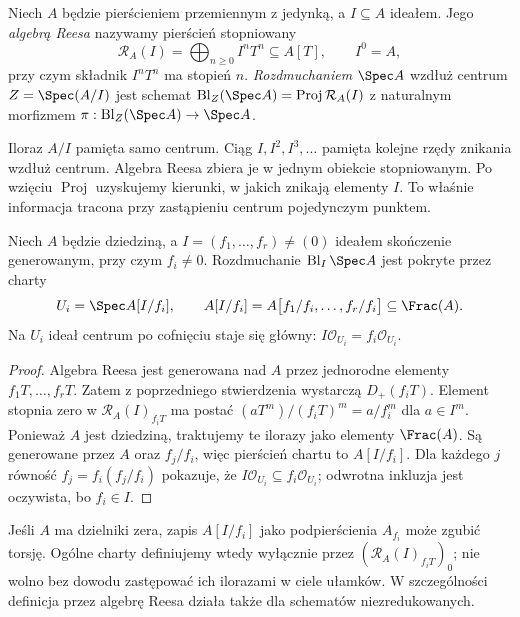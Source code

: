 \begin{definicja}
\label{def:ga5-rees}
Niech $A$ będzie pierścieniem przemiennym z jedynką,
a $I\subseteq A$ ideałem. Jego \emph{algebrą Reesa}
nazywamy pierścień stopniowany
\[
 \mathcal R_A(I)=\bigoplus_{n\ge0}I^nT^n\subseteq A[T],
 \qquad I^0=A,
\]
przy czym składnik $I^nT^n$ ma stopień $n$.
\emph{Rozdmuchaniem} $\Spec A$ wzdłuż centrum
$Z=\Spec(A/I)$ jest schemat
$\operatorname{Bl}_Z(\Spec A)=\operatorname{Proj}\mathcal R_A(I)$
z naturalnym morfizmem $\pi:\operatorname{Bl}_Z(\Spec A)\to\Spec A$.
\end{definicja}

\begin{uwaga}
Iloraz $A/I$ pamięta samo centrum. Ciąg
$I,I^2,I^3,\ldots$ pamięta kolejne rzędy znikania
wzdłuż centrum. Algebra Reesa zbiera je w jednym
obiekcie stopniowanym. Po wzięciu $\operatorname{Proj}$
uzyskujemy kierunki, w jakich znikają elementy $I$.
To właśnie informacja tracona przy zastąpieniu
centrum pojedynczym punktem.
\end{uwaga}

\begin{stwierdzenie}
\label{st:ga5-blowup-charts}
Niech $A$ będzie dziedziną, a
$I=(f_1,\ldots,f_r)\ne(0)$ ideałem skończenie generowanym,
przy czym $f_i\ne0$. Rozdmuchanie $\operatorname{Bl}_I\Spec A$
jest pokryte przez charty
\[
 U_i=\Spec A[I/f_i],\qquad
 A[I/f_i]=A\bigl[f_1/f_i,\ldots,f_r/f_i\bigr]\subseteq\Frac(A).
\]
Na $U_i$ ideał centrum po cofnięciu staje się główny:
$I\mathcal O_{U_i}=f_i\mathcal O_{U_i}$.
\end{stwierdzenie}
\begin{proof}
Algebra Reesa jest generowana nad $A$ przez jednorodne
elementy $f_1T,\ldots,f_rT$. Zatem z poprzedniego
stwierdzenia wystarczą $D_+(f_iT)$. Element stopnia
zero w $\mathcal R_A(I)_{f_iT}$ ma postać
$(aT^m)/(f_iT)^m=a/f_i^m$ dla $a\in I^m$.
Ponieważ $A$ jest dziedziną, traktujemy te ilorazy
jako elementy $\Frac(A)$. Są generowane przez $A$
oraz $f_j/f_i$, więc pierścień chartu to $A[I/f_i]$.
Dla każdego $j$ równość $f_j=f_i(f_j/f_i)$ pokazuje,
że $I\mathcal O_{U_i}\subseteq f_i\mathcal O_{U_i}$;
odwrotna inkluzja jest oczywista, bo $f_i\in I$.
\end{proof}

\begin{uwaga}
Jeśli $A$ ma dzielniki zera, zapis $A[I/f_i]$ jako
podpierścienia $A_{f_i}$ może zgubić torsję. Ogólne
charty definiujemy wtedy wyłącznie przez
$(\mathcal R_A(I)_{f_iT})_0$; nie wolno bez dowodu
zastępować ich ilorazami w ciele ułamków.
W szczególności definicja przez algebrę Reesa działa
także dla schematów niezredukowanych.
\end{uwaga}

